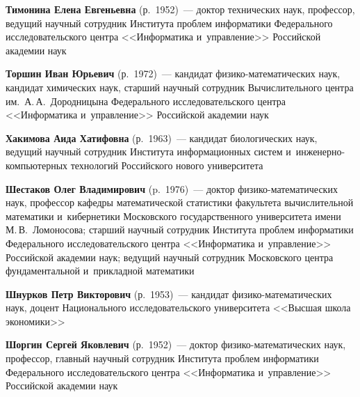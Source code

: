 \begin{multicols}{2}
\noindent
\textbf{Тимонина Елена Евгеньевна} (р.\ 1952)~--- 
доктор технических наук, профессор, ведущий научный сотрудник Института проб\-лем 
информатики \mbox{Федерального} исследовательского цент\-ра <<Информатика и~управ\-ле\-ние>> Российской академии наук

\noindent
\textbf{Торшин Иван Юрьевич} (р.\ 1972)~--- 
кандидат фи\-зи\-ко-ма\-те\-ма\-ти\-че\-ских наук, 
кандидат химических наук, старший научный сотрудник Вычислительного центра им.\
 А.\,А.~Дородницына Федерального исследовательского цент\-ра <<Информатика и~управ\-ле\-ние>>
  Российской академии наук





\noindent
\textbf{Хакимова Аида Хатифовна} (р.\ 1963)~--- 
кандидат биологических наук, ведущий научный сотрудник Института информационных сис\-тем 
и~ин\-же\-нер\-но-компью\-тер\-ных технологий Российского нового университета

\noindent
\textbf{Шестаков Олег Владимирович} (p.\ 1976)~--- доктор фи\-зи\-ко-ма\-те\-ма\-ти\-че\-ских наук, 
профессор ка\-фед\-ры 
математической статистики факультета вы\-чис\-ли\-тель\-ной математики и~кибернетики Московского\linebreak 
государственного университета имени М.\,В.~Ломоносова; 
старший научный сотрудник Института проб\-лем информатики Федерального исследовательского цент\-ра 
<<Информатика и~\mbox{управ\-ле\-ние}>> Российской академии наук; 
ведущий научный со\-труд\-ник Московского цент\-ра фундаментальной и~при\-клад\-ной математики

\noindent
\textbf{Шнурков Петр Викторович} (р.\ 1953)~--- 
кандидат фи\-зи\-ко-ма\-те\-ма\-ти\-че\-ских наук, 
доцент Национального исследовательского университета <<Высшая школа экономики>>

\noindent
\textbf{Шоргин Сергей Яковлевич} (р.\ 1952)~--- 
доктор фи\-зи\-ко-ма\-те\-ма\-ти\-че\-ских наук, профессор, главный научный сотрудник Института проб\-лем 
информатики Федерального исследовательского цент\-ра <<Информатика и~управ\-ле\-ние>> Российской академии наук






\def\leftkol{ОБ АВТОРАХ}

\def\rightkol{ОБ АВТОРАХ}


 \label{end\stat}



\end{multicols}

\def\leftkol{ОБ АВТОРАХ}
\def\rightkol{ОБ АВТОРАХ}

\newpage